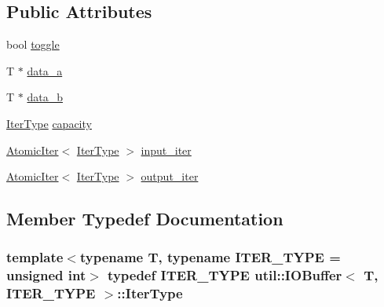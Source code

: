 \subsection*{Public Attributes}
\begin{DoxyCompactItemize}
\item 
bool \hyperlink{structutil_1_1IOBuffer_af5d39f08d97c8069a889e5818805979c}{toggle}
\item 
T $\ast$ \hyperlink{structutil_1_1IOBuffer_a04da979c2cb6738e4a93d3f8bc94e4e3}{data\-\_\-a}
\item 
T $\ast$ \hyperlink{structutil_1_1IOBuffer_a8318163d07c67fb688fcf34b67aff3ce}{data\-\_\-b}
\item 
\hyperlink{structutil_1_1IOBuffer_aa942c705a66498986a60878c9fc125c0}{Iter\-Type} \hyperlink{structutil_1_1IOBuffer_a006eed5dd94ffd328f9a8807828d0ea3}{capacity}
\item 
\hyperlink{structutil_1_1AtomicIter}{Atomic\-Iter}$<$ \hyperlink{structutil_1_1IOBuffer_aa942c705a66498986a60878c9fc125c0}{Iter\-Type} $>$ \hyperlink{structutil_1_1IOBuffer_a99b1d8e0089db4b9d29aaffdbf49948b}{input\-\_\-iter}
\item 
\hyperlink{structutil_1_1AtomicIter}{Atomic\-Iter}$<$ \hyperlink{structutil_1_1IOBuffer_aa942c705a66498986a60878c9fc125c0}{Iter\-Type} $>$ \hyperlink{structutil_1_1IOBuffer_a105bc379d118e236e6864c56c9161cbb}{output\-\_\-iter}
\end{DoxyCompactItemize}


\subsection{Member Typedef Documentation}
\hypertarget{structutil_1_1IOBuffer_aa942c705a66498986a60878c9fc125c0}{
\subsubsection[{Iter\-Type}]{\setlength{\rightskip}{0pt plus 5cm}template$<$typename T, typename I\-T\-E\-R\-\_\-\-T\-Y\-P\-E = unsigned int$>$ typedef I\-T\-E\-R\-\_\-\-T\-Y\-P\-E {\bf util\-::\-I\-O\-Buffer}$<$ T, I\-T\-E\-R\-\_\-\-T\-Y\-P\-E $>$\-::{\bf Iter\-Type}}}\label{structutil_1_1IOBuffer_aa942c705a66498986a60878c9fc125c0}


